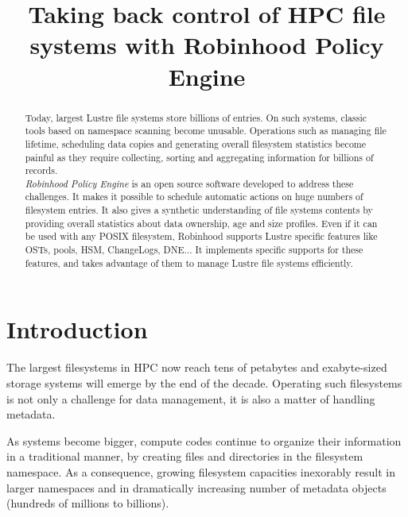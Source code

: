 \documentclass[conference]{IEEEtran}
\begin{document}
\title{Taking back control of HPC file systems with Robinhood Policy Engine}


\author{
}

\maketitle


\begin{abstract}
Today, largest Lustre file systems store billions of entries.
On such systems, classic tools based on namespace scanning become unusable.
Operations such as managing file lifetime, scheduling data copies and generating overall
filesystem statistics become painful as they require collecting, sorting and
aggregating information for billions of records. \\
\emph{Robinhood Policy Engine} is an open source software developed to address these challenges.
It makes it possible to schedule automatic actions on huge numbers of filesystem entries.
It also gives a synthetic understanding of file systems contents by providing overall statistics about data ownership, age and size profiles.
Even if it can be used with any POSIX filesystem, Robinhood supports Lustre specific features like OSTs, pools, HSM, ChangeLogs, DNE...
It implements specific supports for these features, and takes advantage of them to manage Lustre file systems efficiently.
\end{abstract}

\section{Introduction}

The largest filesystems in HPC now reach tens of petabytes\cite{Seq12}
and exabyte-sized storage systems will emerge by the end of the
decade\cite{Exa}. Operating such filesystems is not only a challenge for data
management, it is also a matter of handling metadata.

As systems become bigger, compute codes continue to organize their
information in a traditional manner, by crea\-ting files and directories in the
filesystem namespace. As a consequence, growing filesystem capacities
inexorably result in larger namespaces and in dramatically increasing number
of metadata objects (hundreds of millions to billions).
\end{document}
